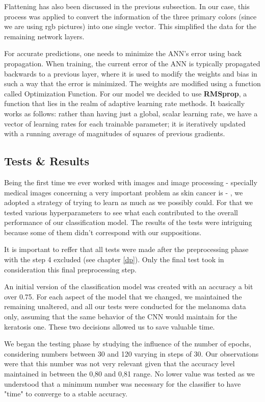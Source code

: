 \documentclass[10pt]{IEEEtran}
\begin{document}
Flattening has also been discussed in the previous subsection.
In our case, this process was applied to convert the information of the three primary colors (since we are using rgb pictures) into one single vector.
This simplified the data for the remaining network layers.

For accurate predictions, one needs to minimize the ANN's error using back propagation. 
When training, the current error of the ANN is typically propagated backwards to a previous layer, where it is used to modify the weights and bias in such a way that the error is minimized. 
The weights are modified using a function called Optimization Function.
For our model we decided to use \textbf{RMSprop}, a function that lies in the realm of adaptive learning rate methods. 
It basically works as follows: rather than having just a global, scalar learning rate, we have a vector of learning rates for each trainable parameter; it is iteratively updated with a running average of magnitudes of squares of previous gradients. 

\newpage{}
\subsection{Tests \& Results}

Being the first time we ever worked with images and image processing - specially medical images concerning a very important problem as skin cancer is - , we adopted a strategy of trying to learn as much as we possibly could. 
For that we tested various hyperparameters to see what each contributed to the overall performance of our classification model.
The results of the tests were intriguing because some of them didn't correspond with our suppositions. 

It is important to reffer that all tests were made after the preprocessing phase with the step 4 excluded (see chapter \ref{dp}). 
Only the final test took in consideration this final preprocessing step.

An initial version of the classification model was created with an accuracy a bit over 0.75.
For each aspect of the model that we changed, we maintained the remaining unaltered, and all our tests were conducted for the melanoma data only, assuming that the same behavior of the CNN would maintain for the keratosis one.
These two decisions allowed us to save valuable time.

We began the testing phase by studying the influence of the number of epochs, considering numbers  between 30 and 120 varying in steps of 30.
Our observations were that this number was not very relevant given that the accuracy level maintained in between the 0,80 and 0,81 range. 
No lower value was tested as we understood that a minimum number was necessary for the classifier to have "time" to converge to a stable accuracy.
\end{document}
